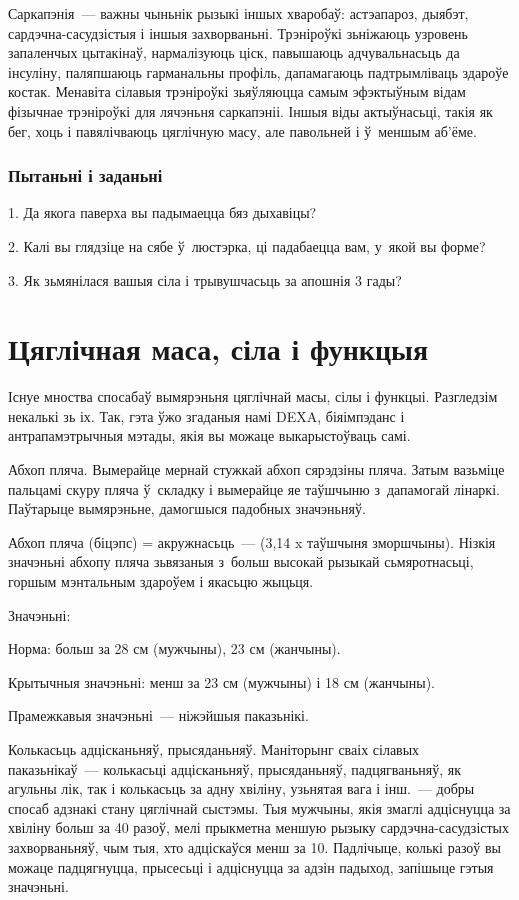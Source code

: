 Саркапэнія~--- важны чыньнік рызыкі іншых хваробаў: астэапароз, дыябэт, сардэчна-сасудзістыя і іншыя захворваньні. Трэніроўкі зьніжаюць узровень запаленчых цытакінаў, нармалізуюць ціск, павышаюць адчувальнасьць да інсуліну, паляпшаюць гарманальны профіль, дапамагаюць падтрымліваць здароўе костак. Менавіта сілавыя трэніроўкі зьяўляюцца самым эфэктыўным відам фізычнае трэніроўкі для лячэньня саркапэніі. Іншыя віды актыўнасьці, такія як бег, хоць і павялічваюць цяглічную масу, але павольней і ў~меншым аб'ёме.

\subsubsection{Пытаньні і заданьні}

1. Да якога паверха вы падымаецца бяз дыхавіцы?

2. Калі вы глядзіце на сябе ў~люстэрка, ці падабаецца вам, у~якой вы форме?

3. Як зьмянілася вашыя сіла і трывушчасьць за апошнія 3 гады?


\section{Цяглічная маса, сіла і функцыя}

Існуе мноства спосабаў вымярэньня цяглічнай масы, сілы і функцыі. Разгледзім некалькі зь іх. Так, гэта ўжо згаданыя намі DEXA, біяімпэданс і антрапамэтрычныя мэтады, якія вы можаце выкарыстоўваць самі.

Абхоп пляча. Вымерайце мернай стужкай абхоп сярэдзіны пляча. Затым вазьміце пальцамі скуру пляча ў~складку і вымерайце яе таўшчыню з~дапамогай лінаркі. Паўтарыце вымярэньне, дамогшыся падобных значэньняў. 

Абхоп пляча (біцэпс) = акружнасьць~--- (3,14 x таўшчыня зморшчыны). Нізкія значэньні абхопу пляча зьвязаныя з~больш высокай рызыкай сьмяротнасьці, горшым мэнтальным здароўем і якасьцю жыцьця.

Значэньні: 

Норма: больш за 28 см (мужчыны), 23 см (жанчыны). 

Крытычныя значэньні: менш за 23 см (мужчыны) і 18 см (жанчыны). 

Прамежкавыя значэньні~--- ніжэйшыя паказьнікі.

Колькасьць адцісканьняў, прысяданьняў. Маніторынг сваіх сілавых паказьнікаў~--- колькасьці адцісканьняў, прысяданьняў, падцягваньняў, як агульны лік, так і колькасьць за адну хвіліну, узьнятая вага і інш.~--- добры спосаб адзнакі стану цяглічнай сыстэмы. Тыя мужчыны, якія змаглі адціснуцца за хвіліну больш за 40 разоў, мелі прыкметна меншую рызыку сардэчна-сасудзістых захворваньняў, чым тыя, хто адціскаўся менш за 10. Падлічыце, колькі разоў вы можаце падцягнуцца, прысесьці і адціснуцца за адзін падыход, запішыце гэтыя значэньні. 

